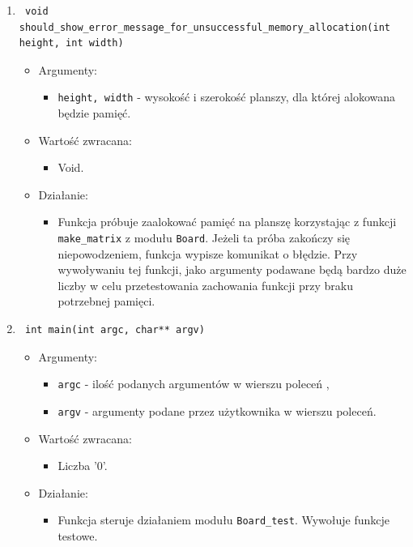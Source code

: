\documentclass[a4paper,11pt, notitlepage ]{article}
\begin{document}
\begin{enumerate}
\item \begin{verbatim} void should_show_error_message_for_unsuccessful_memory_allocation(int height, int width) \end{verbatim}
\begin{itemize}
\item Argumenty:
\begin{itemize}
\item \verb+height, width+ - wysokość i szerokość planszy, dla której alokowana będzie pamięć. 
\end{itemize}
\item Wartość zwracana:
\begin{itemize}
\item Void.
\end{itemize}
\item Działanie:
\begin{itemize}
\item Funkcja próbuje zaalokować pamięć na planszę korzystając z funkcji \verb+make_matrix+ z modułu \verb+Board+. Jeżeli ta próba zakończy się niepowodzeniem, funkcja wypisze komunikat o błędzie. Przy wywoływaniu tej funkcji, jako 
argumenty podawane będą bardzo duże liczby w celu przetestowania zachowania funkcji przy braku potrzebnej pamięci. 
\end{itemize}
\end{itemize}


\item \begin{verbatim} int main(int argc, char** argv) \end{verbatim}
\begin{itemize}
\item Argumenty:
\begin{itemize}
\item \verb+argc+ - ilość podanych argumentów w wierszu poleceń ,
\item \verb+argv+ - argumenty podane przez użytkownika w wierszu poleceń.
\end{itemize}
\item Wartość zwracana:
\begin{itemize}
\item Liczba '0'.
\end{itemize}
\item Działanie:
\begin{itemize}
\item Funkcja steruje działaniem modułu \verb+Board_test+. Wywołuje funkcje testowe.
\end{itemize}
\end{itemize}


\end{enumerate}
\end{document}
